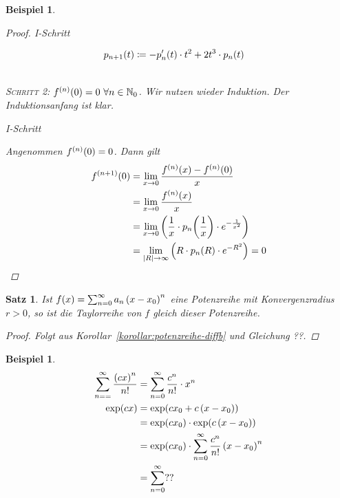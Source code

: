 \documentclass[11pt, twoside, a4paper]{article}
\theoremstyle{plain}
\newtheorem{satz}[blockelement]{Satz}
\newtheorem{beispiel}[blockelement]{Beispiel}
\numberwithin{equation}{subsection}
\newcommand{\pair}[1]{\left(#1\right)}
\newcommand{\of}[1]{\mathopen{}\mathclose{}\bgroup\left(#1\aftergroup\egroup\right)}
\newcommand{\abs}[1]{\left\lvert#1\right\rvert}
\newcommand{\fromto}{\rightarrow{}}
\newcommand{\N}{\mathbb{N}}
\newenvironment{induktionsschritt}{
    \rule{0pt}{3ex}\noindent
    \begin{minipage}[t]{0.11\textwidth}
    {I-Schritt}
    \end{minipage}
    \hfill
    \begin{minipage}[t]{0.89\textwidth}
    }
    {
    \end{minipage}
}
\begin{document}
\begin{beispiel}
\begin{proof}
\begin{induktionsschritt}
\begin{align*}
                    p_{n+1}\of{t} &\coloneqq -p'_n\of{t}\cdot t^2 + 2t^3\cdot p_n\of{t}
                \end{align*}
            \end{induktionsschritt}~\\
            \textsc{Schritt 2}: $f^{(n)}\of{0} = 0~\forall n\in\N_0$. Wir nutzen wieder Induktion. Der Induktionsanfang ist klar.
            \begin{induktionsschritt}
                Angenommen $f^{(n)}\of{0} = 0$. Dann gilt
                \begin{align*}
                    f^{(n+1)}\of{0} &= \lim_{x\fromto 0} \frac{f^{(n)}\of{x} - f^{(n)}\of{0}}{x}\\
                    &= \lim_{x\fromto 0} \frac{f^{(n)}\of{x}}{x}\\
                    &= \lim_{x\fromto 0}\pair{\frac{1}{x}\cdot p_n\of{\frac{1}{x}}\cdot e^{-\frac{1}{x^2}}}\\
                    &= \lim_{\abs{R}\fromto \infty} \pair{R\cdot p_n\of{R}\cdot e^{-R^2}} = 0\qedhere
                \end{align*}
            \end{induktionsschritt}
        \end{proof}
    \end{beispiel}

    \begin{satz} %
        Ist $f\of{x} = \sum_{n=0}^{\infty} a_n\pair{x-x_0}^{n}$ eine Potenzreihe mit Konvergenzradius $r>0$, so ist die Taylorreihe von $f$ gleich dieser Potenzreihe.
        \begin{proof}
            Folgt aus Korollar~\ref{korollar:potenzreihe-diffb} und Gleichung ??.
        \end{proof}
    \end{satz}

    \begin{beispiel}
        \begin{align*}
            \sum_{n==}^{\infty} \frac{\pair{cx}^n}{n!} &= \sum_{n=0}^{\infty} \frac{c^n}{n!}\cdot x^n\\
            \exp\of{cx} &= \exp\of{cx_0 + c\pair{x-x_0}}\\
            &= \exp\of{cx_0}\cdot\exp\of{c\pair{x-x_0}}\\
            &= \exp\of{cx_0}\cdot \sum_{n=0}^{\infty} \frac{c^n}{n!}\pair{x-x_0}^n\\
            &= \sum_{n=0}^{\infty} ??
        \end{align*}
    \end{beispiel}
\end{document}
